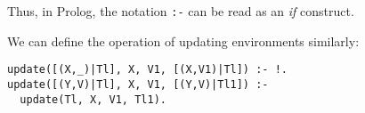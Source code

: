 \documentclass{book}
\begin{document}
Thus, in Prolog, the notation {\tt :-} can be read as an {\em if}
construct.

We can define the operation of updating environments similarly:
\begin{verbatim}
update([(X,_)|Tl], X, V1, [(X,V1)|Tl]) :- !.
update([(Y,V)|Tl], X, V1, [(Y,V)|Tl1]) :- 
  update(Tl, X, V1, Tl1).
\end{verbatim}
\end{document}
